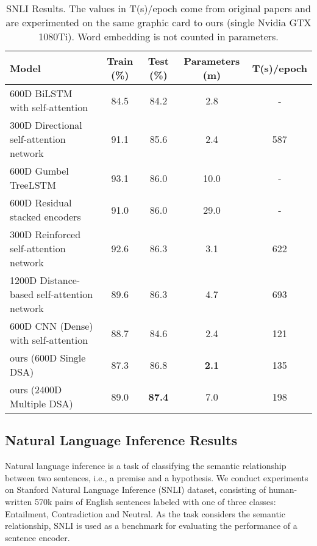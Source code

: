 \documentclass[11pt,a4paper]{article}
\begin{document}
\setlength{\tabcolsep}{0.4em}
\begin{table*}[t]
	\small
	\begin{center}
		\begin{tabular}{|l|c|c|c|c|}
		
			\hline
			{\bf Model}                & {\bf Train (\%)} & {\bf Test (\%)}  & {\bf Parameters (m)} & {\bf T(s)/epoch}  \\ 
			\hline
600D BiLSTM with self-attention \cite{Yang}                & 84.5    & 84.2 & 2.8  & -      \\
300D Directional self-attention network \cite{disan}                 & 91.1    & 85.6 & 2.4  & { 587} \\
600D Gumbel TreeLSTM~\cite{gumble}                 & 93.1    & 86.0 & 10.0  &  -    \\
			600D Residual stacked encoders \cite{residual}              & 91.0    & 86.0 & 29.0  &    -   \\
			300D Reinforced self-attention network \cite{reinforce}                & 92.6    & 86.3 & 3.1  & 622\\
			1200D Distance-based self-attention network \cite{distance}               & 89.6    & 86.3 & 4.7  & 693  \\
\hline
		    600D CNN (Dense) with self-attention & 88.7 & 84.6 & {2.4} &  121     \\
		    ours (600D Single DSA)   & 87.3 & 86.8 & \textbf{2.1}  & 135      \\
		    ours (2400D Multiple DSA)   & 89.0    & \textbf{87.4} & {7.0}  & 198      \\
		    \hline
		\end{tabular}
	\end{center}
	\caption{SNLI Results. The values in T(s)/epoch come from original papers and are experimented on the same graphic card to ours (single Nvidia GTX 1080Ti). Word embedding is not counted in parameters.}
	\label{tab:SNLI}
\end{table*}





\subsection{Natural Language Inference Results}



Natural language inference is a task of classifying the semantic relationship between two sentences, i.e., a premise and a hypothesis. We conduct experiments on Stanford Natural Language Inference (SNLI) dataset, consisting of human-written 570k pairs of English sentences labeled with one of three classes: Entailment, Contradiction and Neutral. As the task considers the semantic relationship, SNLI is used as a benchmark for evaluating the performance of a sentence encoder.
\end{document}
